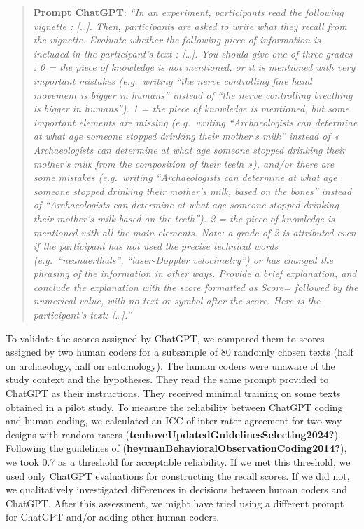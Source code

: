 \documentclass[
  doc,floatsintext]{apa6}
\begin{document}
\begin{quote}
\textbf{Prompt ChatGPT}: \emph{``In an experiment, participants read the following vignette : {[}\ldots{]}. Then, participants are asked to write what they recall from the vignette. Evaluate whether the following piece of information is included in the participant's text : {[}\ldots{]}. You should give one of three grades : 0 = the piece of knowledge is not mentioned, or it is mentioned with very important mistakes (e.g.~writing ``the nerve controlling fine hand movement is bigger in humans'' instead of ``the nerve controlling breathing is bigger in humans''). 1 = the piece of knowledge is mentioned, but some important elements are missing (e.g.~writing ``Archaeologists can determine at what age someone stopped drinking their mother's milk'' instead of « Archaeologists can determine at what age someone stopped drinking their mother's milk from the composition of their teeth »), and/or there are some mistakes (e.g.~writing ``Archaeologists can determine at what age someone stopped drinking their mother's milk, based on the bones'' instead of ``Archaeologists can determine at what age someone stopped drinking their mother's milk based on the teeth''). 2 = the piece of knowledge is mentioned with all the main elements. Note: a grade of 2 is attributed even if the participant has not used the precise technical words (e.g.~``neanderthals'', ``laser-Doppler velocimetry'') or has changed the phrasing of the information in other ways. Provide a brief explanation, and conclude the explanation with the score formatted as Score= followed by the numerical value, with no text or symbol after the score. Here is the participant's text: {[}\ldots{]}.''}
\end{quote}

To validate the scores assigned by ChatGPT, we compared them to scores assigned by two human coders for a subsample of 80 randomly chosen texts (half on archaeology, half on entomology). The human coders were unaware of the study context and the hypotheses. They read the same prompt provided to ChatGPT as their instructions. They received minimal training on some texts obtained in a pilot study. To measure the reliability between ChatGPT coding and human coding, we calculated an ICC of inter-rater agreement for two-way designs with random raters (\textbf{tenhoveUpdatedGuidelinesSelecting2024?}). Following the guidelines of (\textbf{heymanBehavioralObservationCoding2014?}), we took 0.7 as a threshold for acceptable reliability. If we met this threshold, we used only ChatGPT evaluations for constructing the recall scores. If we did not, we qualitatively investigated differences in decisions between human coders and ChatGPT. After this assessment, we might have tried using a different prompt for ChatGPT and/or adding other human coders.
\end{document}
